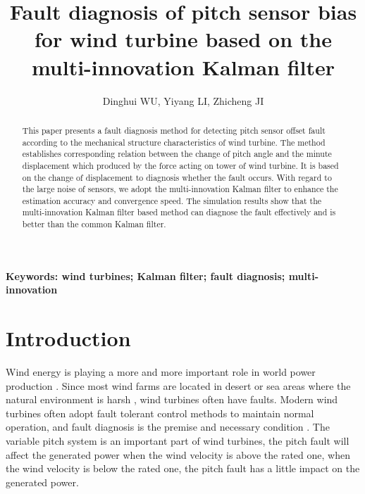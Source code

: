 \documentclass{article}
\begin{document}
\title{Fault diagnosis of pitch sensor bias for wind turbine based on the multi-innovation Kalman filter}

\author{Dinghui WU,
        Yiyang LI,
        Zhicheng JI}
\date{}
\maketitle


\begin{abstract}
This paper presents a fault diagnosis method for detecting pitch sensor
offset fault according to the mechanical structure characteristics of wind turbine.
The method establishes corresponding relation between the change of pitch angle
and the minute displacement which produced by the force acting on tower of
wind turbine. It is based on the change of displacement to diagnosis whether
the fault occurs. With regard to the large noise of sensors, we adopt the
multi-innovation Kalman filter to enhance the estimation accuracy and
convergence speed. The simulation results show that the multi-innovation
Kalman filter based method can diagnose the fault effectively and is
better than the common Kalman filter.
\end{abstract}

\textbf{Keywords: wind turbines; Kalman filter; fault diagnosis; multi-innovation}





\section{Introduction}


Wind energy is playing a more and more important role in world power
production \cite{ref:1}. Since most wind farms are located in desert or sea
areas where the natural environment is harsh \cite{ref:2},
wind turbines often have faults. Modern wind turbines often adopt fault
tolerant control methods to maintain normal operation, and fault
diagnosis is the premise and necessary condition \cite{ref:3}. The variable pitch
system is an important part of wind turbines, the pitch fault
will affect the generated power when the wind velocity is above the rated
one, when the wind velocity is below the rated one, the pitch fault has
a little impact on the generated power.
\end{document}
